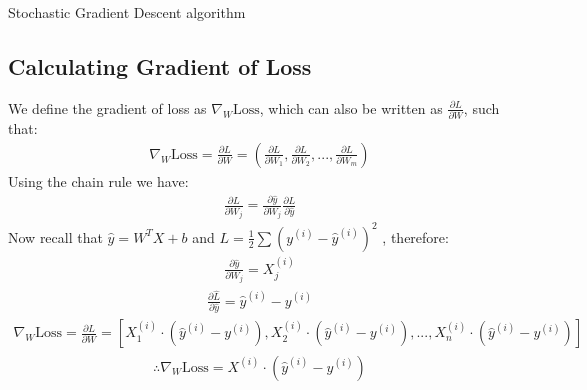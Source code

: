 \documentclass[11pt]{article}
\numberwithin{equation}{section}
\theoremstyle{definition}%
\begin{document}
\begin{algorithm}
    \caption{Stochastic Gradient Descent algorithm}
    \begin{algorithmic}[1]
         
             
                 
                 
                   
                 
            \EndFor
        \EndFor
    \end{algorithmic}
\end{algorithm}

\subsection{Calculating Gradient of Loss}

We define the gradient of loss as $\nabla_W \text{Loss}$, which can also be written as $\frac{\partial L}{\partial W}$, such that: 
\begin{align}
    \nabla_W \text{Loss} = \frac{\partial L}{\partial W} = \left( \frac{\partial L}{\partial W_1}, \frac{\partial L}{\partial W_2}, ..., \frac{\partial L}{\partial W_m} \right)
\end{align}
Using the chain rule we have:
\begin{align}
    \frac{\partial L}{\partial W_j} = \frac{\partial \hat{y}}{\partial W_j} \frac{\partial L}{\partial \hat{y}}
\end{align}
Now recall that $\hat{y} = W^{T}X + b$ and $L = \frac{1}{2} \sum{(y^{(i)} - \hat{y}^{(i)})^{2}}$ , therefore:
\begin{align}
    \frac{\partial \hat{y}}{\partial W_j} = X_j^{(i)}
\end{align}
\begin{align}
    \frac{\partial \hat{L}}{\partial \hat{y}} = \hat{y}^{(i)} - y^{(i)}
\end{align}
\begin{align}
    \nabla_W \text{Loss} = \frac{\partial L}{\partial W} = \left[ X_1^{(i)} \cdot (\hat{y}^{(i)}-y^{(i)}), X_2^{(i)} \cdot (\hat{y}^{(i)}-y^{(i)}), ..., X_n^{(i)} \cdot (\hat{y}^{(i)}-y^{(i)}) \right]
\end{align}
\begin{align}
    \therefore \nabla_W \text{Loss} = X^{(i)} \cdot (\hat{y}^{(i)}-y^{(i)})
\end{align}
\end{document}
